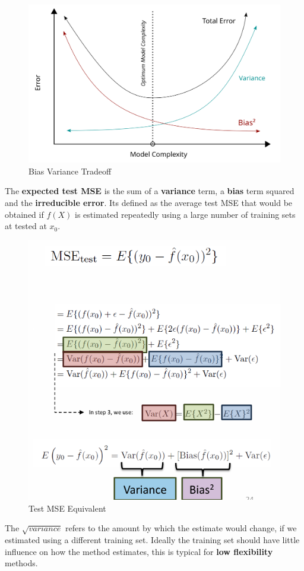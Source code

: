 \documentclass[../Main.tex]{subfiles}
\begin{document}
\begin{figure}[H]
    \centering
    \includegraphics[width=0.75\linewidth]{Images/Bias_and_variance_contributing_to_total_error.svg.png}
    \caption{Bias Variance Tradeoff}
\end{figure}
The \textbf{expected test MSE} is the sum of a \textbf{variance} term, a \textbf{bias} term squared and the \textbf{irreducible error}.  Its defined as the average test MSE that would be obtained if \(f(X)\) is estimated repeatedly using a large number of training sets at tested at \(x_0\).
\begin{figure}[H]
    \centering
    \includegraphics[width=0.75\linewidth]{Images/bias-variance-test-mse.png}
    \caption{Test MSE Equivalent}
\end{figure}

The \(\sqrt{variance}\) refers to the amount by which the estimate would change,
if we estimated using a different training set. 
Ideally the training set should have little influence on how the method estimates, this is typical for \textbf{low flexibility} methods.
\end{document}
